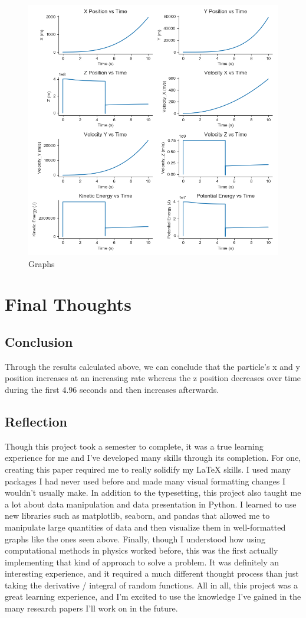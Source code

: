 \documentclass[10pt,letterpaper]{article}
\begin{document}
			 \begin{figure}[h!]
				\centering
				\includegraphics[scale=0.4]{Results.png}
				\caption{Graphs}
				\label{fig:graphs}
			\end{figure}
			\newpage
	\section{Final Thoughts}
		\subsection{Conclusion}
			Through the results calculated above, we can conclude that the particle's x and y position increases at an increasing rate whereas the z position decreases over time during the first 4.96 seconds and then increases afterwards.
		\subsection{Reflection}
			Though this project took a semester to complete, it was a true learning experience for me and I've developed many skills through its completion. For one, creating this paper required me to really solidify my LaTeX skills. I used
			many packages I had never used before and made many visual formatting changes I wouldn't usually make. In addition to the typesetting, this project also taught me a lot about data manipulation and data presentation in Python. I learned
			to use new libraries such as matplotlib, seaborn, and pandas that allowed me to manipulate large quantities of data and then visualize them in well-formatted graphs like the ones seen above. Finally, though I understood how using
			computational methods in physics worked before, this was the first actually implementing that kind of approach to solve a problem. It was definitely an interesting experience, and it required a much different thought process than just
			taking the derivative / integral of random functions. All in all, this project was a great learning experience, and I'm excited to use the knowledge I've gained in the many research papers I'll work on in the future.
\end{document}
